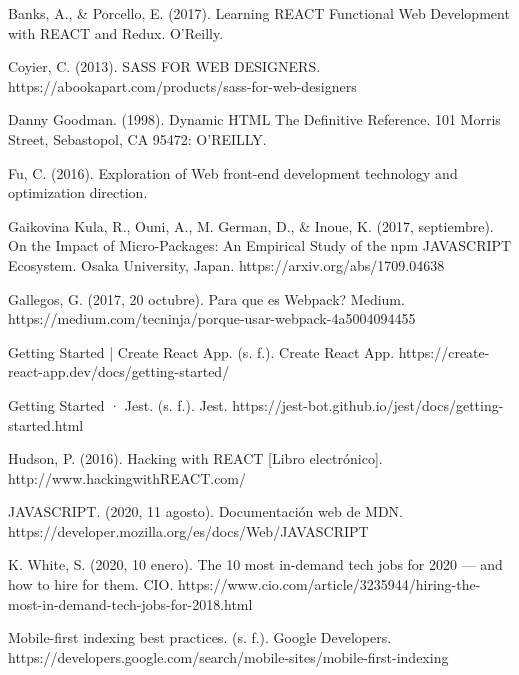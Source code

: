 \renewcommand{\bibname}{}
\patchcmd{\thebibliography}{\chapter*}{\section*}{}{}

\begin{thebibliography}{100} 

 Banks, A., & Porcello, E. (2017). Learning REACT Functional Web Development with REACT and Redux. O’Reilly.

 Coyier, C. (2013). SASS FOR WEB DESIGNERS. https://abookapart.com/products/sass-for-web-designers

 Danny Goodman. (1998). Dynamic HTML The Definitive Reference. 101 Morris Street, Sebastopol, CA 95472: O'REILLY.

 Fu, C. (2016). Exploration of Web front-end development technology and optimization direction.

\bibitem{} Gaikovina Kula, R., Ouni, A., M. German, D., & Inoue, K. (2017, septiembre). On the Impact of Micro-Packages: An Empirical Study of the npm JAVASCRIPT Ecosystem. Osaka University, Japan. https://arxiv.org/abs/1709.04638

 Gallegos, G. (2017, 20 octubre). Para que es Webpack? Medium. https://medium.com/tecninja/porque-usar-webpack-4a5004094455

 Getting Started | Create React App. (s. f.). Create React App. https://create-react-app.dev/docs/getting-started/

 Getting Started · Jest. (s. f.). Jest. https://jest-bot.github.io/jest/docs/getting-started.html

\bibitem{} Hudson, P. (2016). Hacking with REACT [Libro electrónico]. http://www.hackingwithREACT.com/

 JAVASCRIPT. (2020, 11 agosto). Documentación web de MDN. https://developer.mozilla.org/es/docs/Web/JAVASCRIPT

\bibitem{} K. White, S. (2020, 10 enero). The 10 most in-demand tech jobs for 2020 — and how to hire for them. CIO. https://www.cio.com/article/3235944/hiring-the-most-in-demand-tech-jobs-for-2018.html

 Mobile-first indexing best practices. (s. f.). Google Developers. https://developers.google.com/search/mobile-sites/mobile-first-indexing



\end{thebibliography}
